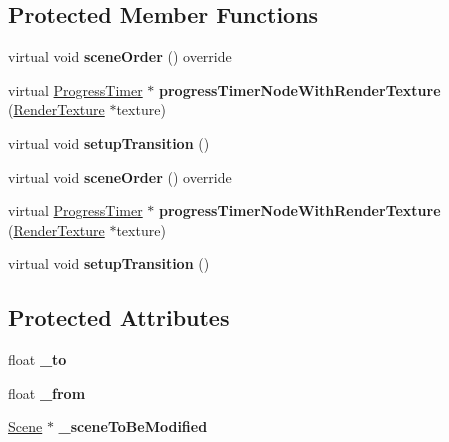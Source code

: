\subsection*{Protected Member Functions}
\begin{DoxyCompactItemize}
\item 
\mbox{\label{classTransitionProgress_aaed8283f62752afc0b8540519df54867}} 
virtual void {\bfseries scene\+Order} () override
\item 
\mbox{\label{classTransitionProgress_a8e7f79ba00b801b7bc468251f2d5bccb}} 
virtual \hyperlink{classProgressTimer}{Progress\+Timer} $\ast$ {\bfseries progress\+Timer\+Node\+With\+Render\+Texture} (\hyperlink{classRenderTexture}{Render\+Texture} $\ast$texture)
\item 
\mbox{\label{classTransitionProgress_aa1311788dc87243803ed7f70299e99ea}} 
virtual void {\bfseries setup\+Transition} ()
\item 
\mbox{\label{classTransitionProgress_ac1cb3d0d3f64862e597f96f89ad49d2c}} 
virtual void {\bfseries scene\+Order} () override
\item 
\mbox{\label{classTransitionProgress_a2cb6ce9929c5448017d54b788f6c1c07}} 
virtual \hyperlink{classProgressTimer}{Progress\+Timer} $\ast$ {\bfseries progress\+Timer\+Node\+With\+Render\+Texture} (\hyperlink{classRenderTexture}{Render\+Texture} $\ast$texture)
\item 
\mbox{\label{classTransitionProgress_aad571bd536977d4e118a815d2e75038b}} 
virtual void {\bfseries setup\+Transition} ()
\end{DoxyCompactItemize}
\subsection*{Protected Attributes}
\begin{DoxyCompactItemize}
\item 
\mbox{\label{classTransitionProgress_aee419c2de8a4b93e9c13401802c8f2f7}} 
float {\bfseries \+\_\+to}
\item 
\mbox{\label{classTransitionProgress_a846062a924cbc03f44e6e28089879286}} 
float {\bfseries \+\_\+from}
\item 
\mbox{\label{classTransitionProgress_a157d8298cc56d98f982a4e80a47deb9e}} 
\hyperlink{classScene}{Scene} $\ast$ {\bfseries \+\_\+scene\+To\+Be\+Modified}
\end{DoxyCompactItemize}
